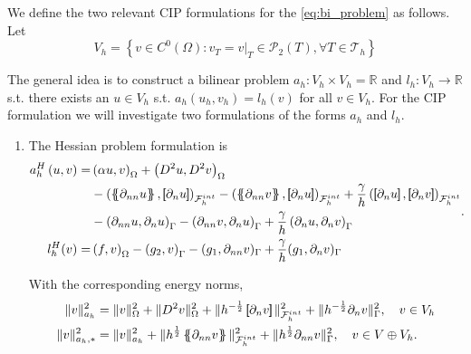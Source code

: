 We define the two relevant CIP formulations for the \eqref{eq:bi_problem} as follows. Let $$V_{h} = \left\{ v \in C^{0}\left( \Omega  \right): v_{T} = v | _{T} \in \mathcal{P} _{2}\left( T \right), \forall T \in
\mathcal{T}_{h}    \right\}$$

The general idea is to construct a bilinear problem $a_{h}: V_{h} \times  V_{h} = \mathbb{R} $ and $l_{h}: V_{h} \to \mathbb{R} $ s.t. there exists an $u \in V_{h}$ s.t. $a_{h}( u_{h}, v_{h}) = l_{h}( v) $ for all $v \in V_{h}$. For the CIP
formulation we will investigate two formulations of the forms $a_{h}$ and $l_{h}$.

\begin{enumerate}[label=\arabic*)]
    \item The Hessian problem formulation is
\begin{equation}
\begin{split}
a_{h}^{H} \left( u, v \right)   =&
    \left( \alpha  u, v \right) _{\Omega }   +  \left( D^2 u, D^2v \right) _{\Omega } \\
 & - \left( \mean{  \partial _{n n} u }, \jump{ \partial _{n }u} \right)_{\mathcal{F}_{h}^{int}}  -
 \left( \mean{ \partial _{n n} v }, \jump{ \partial _{n}u }      \right)_{\mathcal{F}_{h}^{int}}  + \frac{\gamma }{h}  \left( \jump{ \partial _{n} u}, \jump{ \partial _{n} v   }   \right)_{\mathcal{F}_{h}^{int}} \\
 & - \left(   \partial _{n n} u ,  \partial _{n }u \right)_{\Gamma }  -
 \left(  \partial _{n n} v ,  \partial _{n}u       \right)_{\Gamma }  + \frac{\gamma }{h}  \left(  \partial _{n} u,  \partial _{n} v      \right)_{\Gamma } \\
 l_{h}^{H}( v)  =&  \left( f, v \right) _{\Omega }  - \left(g_{2}, v  \right) _{\Gamma } - ( g_{1}, \partial _{nn} v)_{\Gamma } +  \frac{\gamma }{h} ( g_{1} , \partial _{n} v)_{\Gamma }
\end{split}
.
\end{equation}

With the corresponding energy norms,
\begin{equation}
\label{eq:a_cip_energy_norm_hes}
    \begin{split}
 \| v \|_{ a_{h} }^{ 2 }& =  \| v\|_{ \Omega  }^{2  }  +  \| D ^2 v \|_{ \Omega   }^{ 2 }  + \|  h^{-\frac{1}{2}} \jump{ \partial _{n} v    }\|_{  \mathcal{F} _{h}^{int} }^{2  }+ \|  h^{-\frac{1}{2}}  \partial _{n} v    \|_{  \Gamma  }^{2  },  \quad v \in V_{h}  \\
   \| v \|_{ a_{h},* }^{ 2 } &= \| v \|_{ a_{h} }^{ 2 }  + \| h^{\frac{1}{2}}  \mean{     \partial _{nn } v}  \|_{ \mathcal{F}_{h}^{int}   }^{  2}+ \| h^{\frac{1}{2}} \partial _{nn } v  \|_{ \Gamma    }^{  2}, \quad  v\in V \oplus V_{h}.
    \end{split}
\end{equation}



\end{enumerate}
